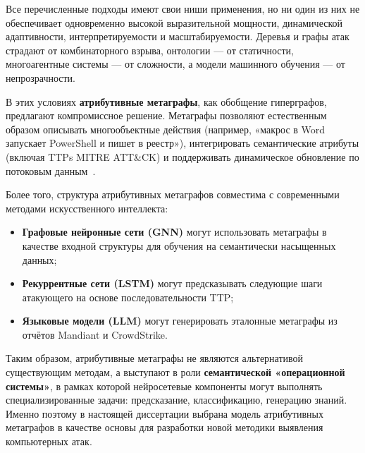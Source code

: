 Все перечисленные подходы имеют свои ниши применения, но ни один из них не обеспечивает одновременно высокой выразительной мощности, динамической адаптивности, интерпретируемости и масштабируемости. Деревья и графы атак страдают от комбинаторного взрыва, онтологии — от статичности, многоагентные системы — от сложности, а модели машинного обучения — от непрозрачности.

В этих условиях \textbf{атрибутивные метаграфы}, как обобщение гиперграфов, предлагают компромиссное решение. Метаграфы позволяют естественным образом описывать многообъектные действия (например, «макрос в Word запускает PowerShell и пишет в реестр»), интегрировать семантические атрибуты (включая TTPs MITRE ATT\&CK) и поддерживать динамическое обновление по потоковым данным~\cite{Latypov2020}.

Более того, структура атрибутивных метаграфов совместима с современными методами искусственного интеллекта:
\begin{itemize}
    \item \textbf{Графовые нейронные сети (GNN)} могут использовать метаграфы в качестве входной структуры для обучения на семантически насыщенных данных;
    \item \textbf{Рекуррентные сети (LSTM)} могут предсказывать следующие шаги атакующего на основе последовательности TTP;
    \item \textbf{Языковые модели (LLM)} могут генерировать эталонные метаграфы из отчётов Mandiant и CrowdStrike.
\end{itemize}
Таким образом, атрибутивные метаграфы не являются альтернативой существующим методам, а выступают в роли \textbf{семантической «операционной системы»}, в рамках которой нейросетевые компоненты могут выполнять специализированные задачи: предсказание, классификацию, генерацию знаний. Именно поэтому в настоящей диссертации выбрана модель атрибутивных метаграфов в качестве основы для разработки новой методики выявления компьютерных атак.

